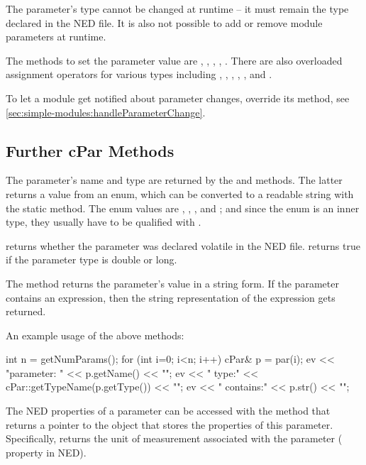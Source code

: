 \begin{note}
    The parameter's type cannot be changed at runtime -- it must
    remain the type declared in the NED file. It is also not possible
    to add or remove module parameters at runtime.
\end{note}

The methods to set the parameter value are ,
, ,
, . There are also
overloaded assignment operators for various types including ,
, , , , and
.

To let a module get notified about parameter changes, override
its  method, see
\ref{sec:simple-modules:handleParameterChange}.


\subsection{Further cPar Methods}

The parameter's name and type are returned by the  and
 methods. The latter returns a value from an enum,
which can be converted to a readable string with the 
static method. The enum values are , , ,
 and ; and since the enum is an inner type,
they usually have to be qualified with .

 returns whether the parameter was declared volatile
in the NED file.  returns true if the parameter
type is double or long.

The  method returns the parameter's value in a string form.
If the parameter contains an expression, then the string representation
of the expression gets returned.

An example usage of the above methods:

\begin{cpp}
int n = getNumParams();
for (int i=0; i<n; i++)
{
    cPar& p = par(i);
    ev << "parameter: " << p.getName() << "\n";
    ev << "  type:" << cPar::getTypeName(p.getType()) << "\n";
    ev << "  contains:" << p.str() << "\n";
}
\end{cpp}

The NED properties of a parameter can be accessed with the 
method that returns a pointer to the  object that stores
the properties of this parameter. Specifically,  returns
the unit of measurement associated with the parameter ( property in NED).

